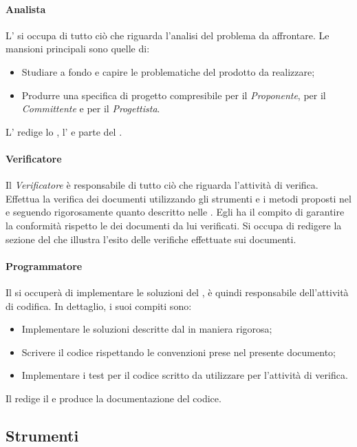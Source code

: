 \paragraph{Analista}
L'\textsl{\Ana} si occupa di tutto ciò che riguarda l'analisi del problema da 
affrontare. Le mansioni principali sono quelle di:
\begin{itemize}
  \item Studiare a fondo e capire le problematiche del prodotto da realizzare;
  \item Produrre una specifica di progetto compresibile per il 
  \textsl{Proponente}, per il \textsl{Committente} e per il 
  \textsl{Progettista}.
\end{itemize}
L'\textsl{\Ana} redige lo \textsl{\SdF}, l'\textsl{\AdR} e parte del 
\textsl{\PdQ}.

\paragraph{Verificatore}
Il \textsl{Verificatore} è responsabile di tutto ciò che riguarda l'attività di verifica.
Effettua la verifica dei documenti utilizzando gli strumenti e i metodi proposti nel 
\textsl{\PdQ} e seguendo rigorosamente quanto descritto nelle \textsl{\NdP}.
Egli ha il compito di garantire la conformità rispetto le \textsl{\NdP} dei documenti da lui verificati. 
Si occupa di redigere la sezione del \textsl{\PdQ} che illustra l'esito delle 
verifiche effettuate sui documenti.

\paragraph{Programmatore}
Il \textsl{\Progr} si occuperà di implementare le soluzioni del \textsl{\Prog}, è quindi 
responsabile dell'attività di codifica. In dettaglio, i suoi compiti sono:
\begin{itemize}
  \item Implementare le soluzioni descritte dal \textsl{\Prog} in maniera 
  rigorosa;
  \item Scrivere il codice rispettando le convenzioni prese nel presente 
  documento;
  \item Implementare i test per il codice scritto da utilizzare per l'attività 
  di verifica.
\end{itemize}
Il \textsl{\Progr} redige il \textsl{\MU} e produce la documentazione del codice.

\subsection{Strumenti}

